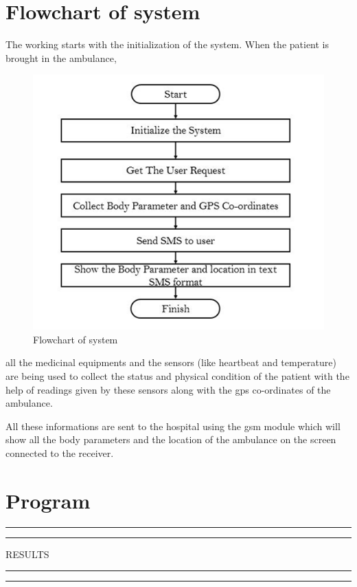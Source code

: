 \documentclass[12pt,a4paper,oneside,openright]{report}
\begin{document}
\section{Flowchart of system}
The working starts with the initialization of the system. When the patient is brought in the ambulance, 
\begin{figure}[!h]
 \centering
 \includegraphics[width = .70\textwidth]{Figures/25.jpg}
 \caption{Flowchart of system}
 \label{Flowchart of system}
\end{figure}
all the medicinal equipments and the sensors (like heartbeat and temperature) are being used to collect the status and physical condition of the patient with the help of readings given by these sensors along with the gps co-ordinates of the ambulance.

All these informations are sent to the hospital using the gsm module which will show all the body parameters and the location of the ambulance on the screen connected to the receiver. 

\section{Program}



\newpage
\vspace*{\fill}
 \begin{center}
\hrule%
\vspace{1pt}%
\hrule
\vspace{1pc}%
\LARGE\MakeUppercase{RESULTS} 
\vspace{1pc}%
\hrule%
\vspace{1pt}%
\hrule
 \end{center}
 \vspace*{\fill}
\end{document}
